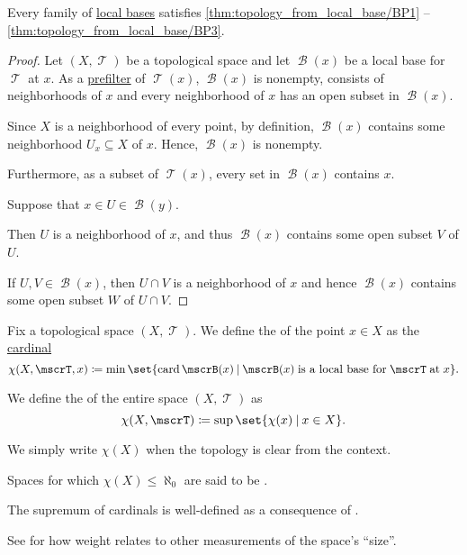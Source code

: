\begin{proposition}\label{thm:local_base_can_generate_topology}
  Every family of \hyperref[def:topological_local_base]{local bases} satisfies \ref{thm:topology_from_local_base/BP1} -- \ref{thm:topology_from_local_base/BP3}.
\end{proposition}
\begin{proof}
  Let \( (X, \mscrT) \) be a topological space and let \( \mscrB(x) \) be a local base for \( \mscrT \) at \( x \). As a \hyperref[def:prefilter]{prefilter} of \( \mscrT(x) \), \( \mscrB(x) \) is nonempty, consists of neighborhoods of \( x \) and every neighborhood of \( x \) has an open subset in \( \mscrB(x) \).

   Since \( X \) is a neighborhood of every point, by definition, \( \mscrB(x) \) contains some neighborhood \( U_x \subseteq X \) of \( x \). Hence, \( \mscrB(x) \) is nonempty.

  Furthermore, as a subset of \( \mscrT(x) \), every set in \( \mscrB(x) \) contains \( x \).

   Suppose that \( x \in U \in \mscrB(y) \).

  Then \( U \) is a neighborhood of \( x \), and thus \( \mscrB(x) \) contains some open subset \( V \) of \( U \).

   If \( U, V \in \mscrB(x) \), then \( U \cap V \) is a neighborhood of \( x \) and hence \( \mscrB(x) \) contains some open subset \( W \) of \( U \cap V \).
\end{proof}

\begin{definition}\label{def:topological_space_character}
  Fix a topological space \( (X, \mscrT) \). We define the  of the point \( x \in X \) as the \hyperref[def:cardinal]{cardinal}
  \begin{equation*}
    \chi(X, \mscrT, x) \coloneqq \min \set{ \card \mscrB(x) \given \mscrB(x) \T{is a local base for} \mscrT \T{at} x }.
  \end{equation*}

  We define the  of the entire space \( (X, \mscrT) \) as
  \begin{equation*}
    \chi(X, \mscrT) \coloneqq \sup \set{ \chi(x) \given x \in X }.
  \end{equation*}

  We simply write \( \chi(X) \) when the topology is clear from the context.

  Spaces for which \( \chi(X) \leq \hyperref[def:aleph_hierarchy]{\aleph_0} \) are said to be .
\end{definition}
\begin{comments}
  \item The supremum of cardinals is well-defined as a consequence of .
  \item See  for how weight relates to other measurements of the space's \enquote{size}.
\end{comments}

